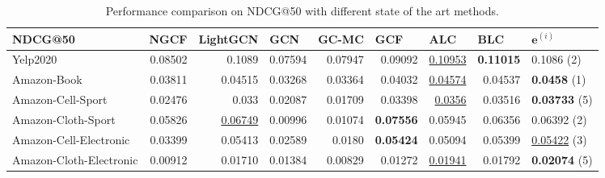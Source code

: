 \begin{table*}[h!]
    \centering
    \begin{tabular}{|l|r|r|r|r|r||r|r|l|}
        \hline
        NDCG@50                 & \multicolumn{1}{l|}{NGCF} & \multicolumn{1}{l|}{LightGCN} & \multicolumn{1}{l|}{GCN} & \multicolumn{1}{l|}{GC-MC} & \multicolumn{1}{l||}{GCF} & \multicolumn{1}{l|}{ALC} & \multicolumn{1}{l|}{BLC} & $\mathbf{e}^{(i)}$      \\ \hline
        Yelp2020                & 0.08502                   & 0.1089                        & 0.07594                  & 0.07947                    & 0.09092                   & \underline{0.10953}      & \textbf{0.11015}         & 0.1086 (2)              \\ \hline
        Amazon-Book             & 0.03811                   & 0.04515                       & 0.03268                  & 0.03364                    & 0.04032                   & \underline{0.04574}      & 0.04537                  & \textbf{0.0458} (1)     \\ \hline
        Amazon-Cell-Sport       & 0.02476                   & 0.033                         & 0.02087                  & 0.01709                    & 0.03398                   & \underline{0.0356}       & 0.03516                  & \textbf{0.03733} (5)    \\ \hline
        Amazon-Cloth-Sport      & 0.05826                   & \underline{0.06749}           & 0.00996                  & 0.01074                    & \textbf{0.07556}          & 0.05945                  & 0.06356                  & 0.06392 (2)             \\ \hline
        Amazon-Cell-Electronic  & 0.03399                   & 0.05413                       & 0.02589                  & 0.0180                     & \textbf{0.05424}          & 0.05094                  & 0.05399                  & \underline{0.05422} (3) \\ \hline
        Amazon-Cloth-Electronic & 0.00912                   & 0.01710                       & 0.01384                  & 0.00829                    & 0.01272                   & \underline{0.01941}      & 0.01792                  & \textbf{0.02074} (5)    \\ \hline
    \end{tabular}
    \caption{Performance comparison on NDCG@50 with different state of the art methods.}
    \label{tab:baselines-ndcg}
\end{table*}

